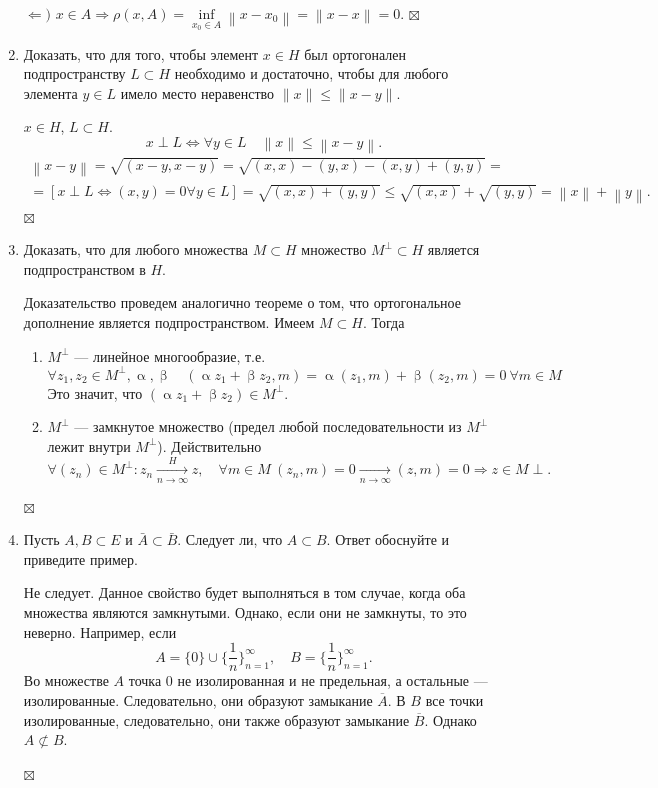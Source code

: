\documentclass[a4paper, 12pt]{report}
\newenvironment{Proof} %
{\par\noindent{$\blacklozenge$}} %
{\hfill$\scriptstyle\boxtimes$}
\renewcommand{\leq}{\leqslant}
\renewcommand{\alpha}{\upalpha}
\renewcommand{\beta}{\upbeta}
\newcommand\Norm[1]{\left\| #1 \right\|}
\begin{document}
\begin{enumerate}
\begin{Proof}
		$\Leftarrow)$ $x \in A \Rightarrow \rho(x, A) = \underset{x_0 \in A}{\inf}\Norm{x -x_0} = \Norm{x - x} = 0.$ 
		\end{Proof}
		\item Доказать, что для того, чтобы элемент $x \in H$ был ортогонален подпространству $L \subset H$ необходимо и достаточно, чтобы для любого элемента $y \in L$ имело место неравенство $\|x\| \leqslant\|x-y\|$.
		\begin{Proof}
			$x \in H$, $L\subset H$. $$x\perp L \Longleftrightarrow \forall y \in L \quad \Norm{x} \leq \Norm{x-y}.$$
		\begin{multline*}
			\Norm{x-y} = \sqrt{(x-y, x-y)} = \sqrt{(x,x) - (y,x) - (x,y) + (y,y)} =\\= [x\perp L \Longleftrightarrow (x,y) = 0\forall y \in L] = \sqrt{(x,x) + (y,y)}\leq \sqrt{(x,x)} + \sqrt{(y,y)} = \Norm{x} + \Norm{y}.
		\end{multline*}
		\end{Proof}
		\item Доказать, что для любого множества $M \subset H$ множество $M^{\perp} \subset H$ является подпространством в $H$.
		\begin{Proof}
			Доказательство проведем аналогично теореме о том, что ортогональное дополнение является подпространством. Имеем $M \subset H$. Тогда \begin{enumerate}
			\item $M^\perp$ --- линейное многообразие, т.е. $$\forall z_1, z_2 \in M^\perp, \alpha,\beta \quad (\alpha z_1 + \beta z_2, m) = \alpha(z_1,m) + \beta(z_2,m) = 0\ \forall m \in M$$
			Это значит, что $(\alpha z_1 +\beta z_2) \in M^\perp$.
			\item $M^\perp$ --- замкнутое множество (предел любой последовательности из $M^\perp$ лежит внутри $M^\perp$). Действительно $$\forall (z_n)\in M^\perp: z_n \xrightarrow[n\to\infty]{H}z, \quad \forall m \in M\ (z_n, m) = 0 \xrightarrow[n\to\infty]{} (z, m) =0\Rightarrow z \in M\perp.$$
		\end{enumerate}
		\end{Proof}
		\item Пусть $A, B \subset E$ и $\bar{A} \subset \bar{B}$. Следует ли, что $A \subset B$. Ответ обоснуйте и приведите пример.
		 \begin{Proof}
		 	Не следует. Данное свойство будет выполняться в том случае, когда оба множества являются замкнутыми. Однако, если они не замкнуты, то это неверно. Например, если $$A = \{0\} \cup \Big\{\dfrac{1}{n}\Big\}_{n=1}^{\infty},\quad B = \Big\{\dfrac{1}{n}\Big\}_{n=1}^{\infty}.$$ Во множестве $A$ точка 0 не изолированная и не предельная, а остальные --- изолированные. Следовательно, они образуют замыкание $\overline{A}$. В $B$ все точки изолированные, следовательно, они также образуют замыкание $\overline{B}$. Однако $A \not \subset B$.

\end{Proof}
\end{enumerate}
\end{document}
